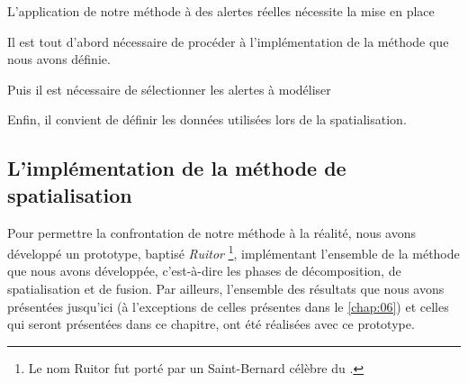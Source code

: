 L’application de notre méthode à des alertes réelles nécessite la mise
en place  

Il est tout d'abord nécessaire de procéder à l'implémentation de la
méthode que nous avons définie.

Puis il est nécessaire de sélectionner les alertes à modéliser

Enfin, il convient de définir les données utilisées lors de la
spatialisation.

\subsection{L'implémentation de la méthode de spatialisation}

Pour permettre la confrontation de notre méthode à la réalité, nous
avons développé un prototype, baptisé \emph{Ruitor} \footnote{Le nom
  Ruitor fut porté par un Saint-Bernard célèbre du
  .}, implémentant l'ensemble de la méthode que nous
avons développée, c'est-à-dire les phases de décomposition, de
spatialisation et de fusion. Par ailleurs, l'ensemble des résultats
que nous avons présentées jusqu'ici (à l'exceptions de celles
présentes dans le \autoref{chap:06}) et celles qui seront présentées
dans ce chapitre, ont été réalisées avec ce prototype.

